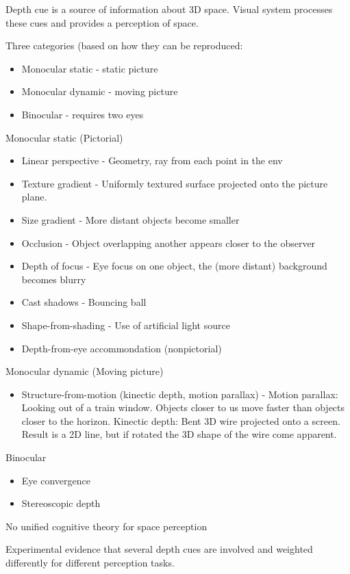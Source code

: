 \documentclass[a4paper]{article}
\begin{document}
Depth cue is a source of information about 3D space. Visual system processes these cues and provides a perception of space. 

Three categories (based on how they can be reproduced:
\begin{itemize}
  \item Monocular static - static picture
  \item Monocular dynamic - moving picture
  \item Binocular - requires two eyes
\end{itemize}

Monocular static (Pictorial)
\begin{itemize}
  \item Linear perspective - Geometry, ray from each point in the env
  \item Texture gradient - Uniformly textured surface projected onto the picture plane.
  \item Size gradient - More distant objects become smaller
  \item Occlusion - Object overlapping another appears closer to the observer
  \item Depth of focus - Eye focus on one object, the (more distant) background becomes blurry
  \item Cast shadows - Bouncing ball
  \item Shape-from-shading - Use of artificial light source
  \item Depth-from-eye accommondation (nonpictorial) 
\end{itemize}

Monocular dynamic (Moving picture)
\begin{itemize}
  \item Structure-from-motion (kinectic depth, motion parallax) - Motion parallax: Looking out of a train window. Objects closer to us move faster than objects closer to the horizon. Kinectic depth: Bent 3D wire projected onto a screen. Result is a 2D line, but if rotated the 3D shape of the wire come apparent.
\end{itemize}

Binocular
\begin{itemize}
  \item Eye convergence
  \item Stereoscopic depth
\end{itemize}

No unified cognitive theory for space perception

Experimental evidence that several depth cues are involved and weighted differently for different perception tasks.
\end{document}
